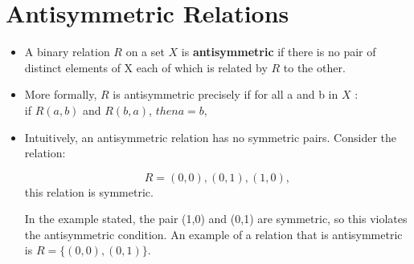 \documentclass[12pt]{article}
\begin{document}
\section*{Antisymmetric Relations}

\begin{itemize}
\item A binary relation $R$ on a set $X$ is \textbf{antisymmetric} if there is no pair of distinct elements of X each of which is related by $R$ to the other. 

\item More formally, $R$ is antisymmetric precisely if for all a and b in $X$ :\\
if $R(a,b)$ and $R(b,a)$, $then a = b$,

\item Intuitively, an antisymmetric relation has no symmetric pairs. Consider the relation: 

\[R = { (0,0) , (0,1) , (1,0) } ,\] this relation is symmetric. 

In the example stated, the pair (1,0) and (0,1) are symmetric, so this violates the antisymmetric condition. An example of a relation that is antisymmetric is $R=\{(0,0),(0,1)\}$.
\end{itemize}
\end{document}
